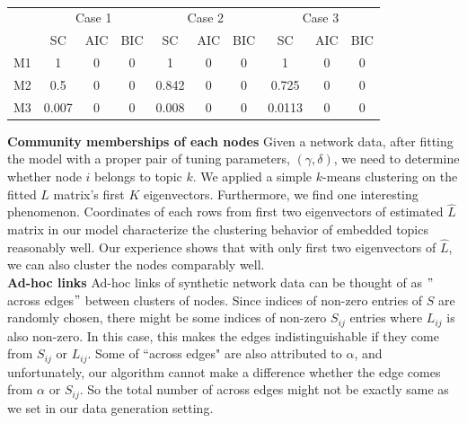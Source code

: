 \documentclass[AMS,STIX1COL]{WileyNJD-v2}
\begin{document}
\begin{table}[h]
\centering
\begin{tabular}{c|ccc|ccc|ccc}
   & \multicolumn{3}{c|}{Case 1} & \multicolumn{3}{c|}{Case 2} & \multicolumn{3}{c}{Case 3} \\ \cline{2-10} 
   & SC        & AIC    & BIC    & SC        & AIC    & BIC    & SC        & AIC    & BIC   \\ \hline
M1 & 1         & 0      & 0      & 1         & 0      & 0      & 1         & 0      & 0     \\
M2 & 0.5       & 0      & 0      & 0.842     & 0      & 0      & 0.725     & 0      & 0     \\
M3 & 0.007     & 0      & 0      & 0.008     & 0      & 0      & 0.0113    & 0      & 0    
\end{tabular}
\caption{}
\label{tab:table1}
\end{table}


\noindent \textbf{Community memberships of each nodes} Given a network data, after fitting the model with a proper pair of tuning parameters, $(\gamma,\delta)$, we need to determine whether node $i$ belongs to topic $k$. 
We applied a simple $k$-means clustering on the fitted $L$ matrix's first $K$ eigenvectors. 
Furthermore, we find one interesting phenomenon. 
Coordinates of each rows from first two eigenvectors of estimated $\hat{L}$ matrix in our model characterize the clustering behavior of embedded topics reasonably well. 
Our experience shows that with only first two eigenvectors of $\hat{L}$, we can also cluster the nodes comparably well. \\

\noindent \textbf{Ad-hoc links} Ad-hoc links of synthetic network data can be thought of as $"$across edges$"$ between clusters of nodes. 
Since indices of non-zero entries of $S$ are randomly chosen, there might be some indices of non-zero $S_{ij}$ entries where $L_{ij}$ is also non-zero. 
In this case, this makes the edges indistinguishable if they come from $S_{ij}$ or $L_{ij}$. 
Some of ``across edges" are also attributed to $\alpha$, and unfortunately, our algorithm cannot make a difference whether the edge comes from $\alpha$ or $S_{ij}$. 
So the total number of across edges might not be exactly same as we set in our data generation setting. \\
\end{document}
